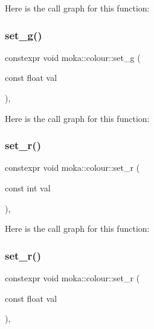 Here is the call graph for this function\+:
\mbox{\label{classmoka_1_1colour_af0e845db8ecc3a17e371fb3f9523273f}} 
\subsubsection{\texorpdfstring{set\_g()}{set\_g()}\hspace{0.1cm}{\footnotesize\ttfamily [2/2]}}
{\footnotesize\ttfamily constexpr void moka\+::colour\+::set\+\_\+g (\begin{DoxyParamCaption}\item[{const float}]{val }\end{DoxyParamCaption})\hspace{0.3cm}{\ttfamily [inline]}, {\ttfamily [noexcept]}}

Here is the call graph for this function\+:
\mbox{\label{classmoka_1_1colour_acf6a295464965ba7da438056c3b93986}} 
\subsubsection{\texorpdfstring{set\_r()}{set\_r()}\hspace{0.1cm}{\footnotesize\ttfamily [1/2]}}
{\footnotesize\ttfamily constexpr void moka\+::colour\+::set\+\_\+r (\begin{DoxyParamCaption}\item[{const int}]{val }\end{DoxyParamCaption})\hspace{0.3cm}{\ttfamily [inline]}, {\ttfamily [noexcept]}}

Here is the call graph for this function\+:
\mbox{\label{classmoka_1_1colour_a5c03d583bf2b0d33e46b9c17defab90d}} 
\subsubsection{\texorpdfstring{set\_r()}{set\_r()}\hspace{0.1cm}{\footnotesize\ttfamily [2/2]}}
{\footnotesize\ttfamily constexpr void moka\+::colour\+::set\+\_\+r (\begin{DoxyParamCaption}\item[{const float}]{val }\end{DoxyParamCaption})\hspace{0.3cm}{\ttfamily [inline]}, {\ttfamily [noexcept]}}

